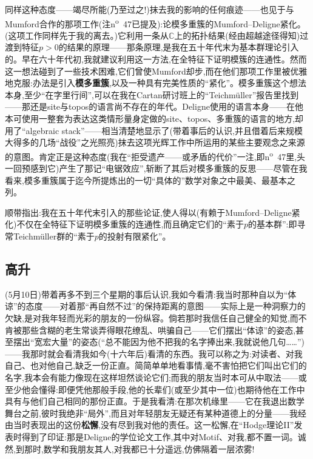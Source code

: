 同样这种态度——竭尽所能(乃至过之!)抹去我的影响的任何痕迹——也见于与Mumford合作的那项工作(注n\textsuperscript{o}~47已提及):论模多重簇的Mumford--Deligne紧化。(这项工作同样先于我的离去。)它利用一条从$\mathbb{C}$上的拓扑结果(经由超越途径得知)过渡到特征$p>0$的结果的原理——那条原理,是我在五十年代末为基本群理论引入的\dmark{}。早在六十年代初,我就建议利用这一方法,在全特征下证明模簇的连通性。然而这一想法碰到了一些技术困难,它们曾使Mumford却步,而在他们那项工作里被优雅地克服:办法是引入\textbf{模多重簇},以及一种具有完美性质的“紧化”。模多重簇这个想法本身,至少“在字里行间”,可以在我在Cartan研讨班上的“Teichmüller”报告里找到——那还是site与topos的语言尚不存在的年代。Deligne使用的语言本身——在他本可使用一整套为表达这类情形量身定做的site、topos、多重簇的语言的地方,却用了“algebraic stack”——相当清楚地显示了(带着事后的认识,并且借着后来规模大得多的几场“战役”之光照亮)抹去这项光辉工作中所运用的某些主要观念之来源的意图。肯定正是这种态度(我在“拒受遗产——或矛盾的代价”一注,即n\textsuperscript{o}~47里,头一回预感到它)产生了那记“电锯效应”,斩断了其后对模多重簇的反思——尽管在我看来,模多重簇属于迄今所提炼出的一切“具体的”数学对象之中最美、最基本之列。

顺带指出:我在五十年代末引入的那些论证,使人得以(有赖于Mumford--Deligne紧化)不仅在全特征下证明模多重簇的连通性,而且确定它们的“素于$p$的基本群”:即寻常Teichmüller群的“素于$p$的投射有限紧化”。

\subsection{高升}


(5月10日)带着再多不到三个星期的事后认识,我如今看清:我当时那种自以为“体谅”的态度——对着那“再自然不过”的保持距离的意图——实际上是一种洞察力的欠缺,是对我年轻而光彩的朋友的一份纵容。倘若那时我信任自己健全的知觉,而不肯被那些含糊的老生常谈弄得眼花缭乱、哄骗自己——它们摆出“体谅”的姿态,甚至摆出“宽宏大量”的姿态(“总不能因为他不把我的名字捧出来,我就说他几句……”)——我那时就会看清我如今(十六年后)看清的东西。我可以称之为:对读者、对我自己、也对他自己,缺乏一份正直。简简单单地看事情,毫不害怕把它们\dmark{}叫出它们的名字,我本会有能力像现在这样坦然谈论它们;而我的朋友当时本可从中取法——或至少他会懂得:即便凭他那般手段,他的长辈们(或至少其中一位)也期待他在工作中具有与他们自己相同的那份正直。于是我看清:在那次机缘里——它在我退出数学舞台之前,彼时我绝非“局外”,而且对年轻朋友无疑还有某种道德上的分量——我经由当时表现出的这份\textbf{松懈},没有尽到我对他的责任。这一松懈,在“Hodge理论II”发表时得到了印证:那是Deligne的学位论文工作,其中对Motif、对我,都不置一词。诚然,到那时,数学和我朋友其人,对我都已十分遥远,仿佛隔着一层浓雾!

